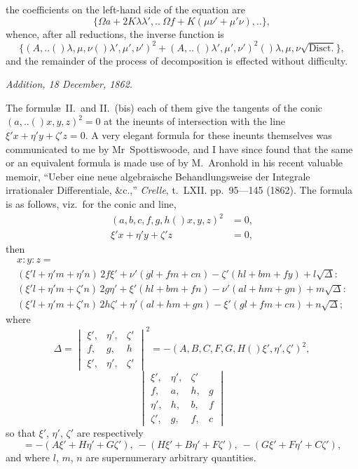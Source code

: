 \documentclass[11pt,a4paper]{book}
\providecommand{\qform}[1]{(#1)}
\begin{document}
the coefficients on the left-hand side of the equation are
\[
\{\Omega a + 2K\lambda\lambda',..\ \Omega f + K(\mu\nu' + \mu'\nu),..\},
\]
whence, after all reductions, the inverse function is
\[
\{(A,..\!\qform{}{\lambda, \mu, \nu}\!\qform{}{\lambda', \mu', \nu'})^{2}
+ (A,..\!\qform{}{\lambda', \mu', \nu'})^{2}\!\qform{}{\lambda, \mu, \nu}
\sqrt{\text{Disct.}}\},
\]
and the remainder of the process of decomposition is effected without difficulty.

\medskip
\begin{center}
\textit{Addition, 18 December, 1862.}
\end{center}

The formul\ae\ II.\ and II.\ (bis) each of them give the tangents of the conic
$(a,..\!\qform{}{x, y, z})^{2} = 0$ at the ineunts of intersection with the line
$\xi'x + \eta'y + \zeta'z = 0$. A very elegant formula for these ineunts themselves
was communicated to me by Mr~Spottiswoode, and I have since found that the same or
an equivalent formula is made use of by M.~Aronhold in his recent valuable memoir,
``Ueber eine neue algebraische Behandlungsweise der Integrale irrationaler
Differentiale, \&c.,'' \textit{Crelle}, t.~LXII. pp.~95---145 (1862). The formula is as
follows, viz.\ for the conic and line,
\begin{align*}
(a, b, c, f, g, h\!\qform{}{x, y, z})^{2} &= 0,\\
\xi'x + \eta'y + \zeta'z &= 0,
\end{align*}
then
\begin{multline*}
x : y : z =\\
(\xi'l + \eta'm + \eta'n)\,2f\xi' + \nu'(gl + fm + cn) - \zeta'(hl + bm + fy) + l\sqrt{\Delta} :\\
(\xi'l + \eta'm + \zeta'n)\,2g\eta' + \xi'(hl + bm + fn) - \nu'(al + hm + gn) + m\sqrt{\Delta} :\\
(\xi'l + \eta'm + \zeta'n)\,2h\zeta' + \eta'(al + hm + gn) - \xi'(gl + fm + cn) + n\sqrt{\Delta};
\end{multline*}
where
\[
\Delta =
\begin{vmatrix}
\xi', & \eta', & \zeta'\\
f, & g, & h\\
\xi', & \eta', & \zeta'
\end{vmatrix}^{2}
= -(A, B, C, F, G, H\!\qform{}{\xi', \eta', \zeta'})^{2},
\]
\[
\begin{vmatrix}
\xi', & \eta', & \zeta'\\
f, & a, & h, & g\\
\eta', & h, & b, & f\\
\zeta', & g, & f, & c
\end{vmatrix}
\]
so that $\xi'$, $\eta'$, $\zeta'$ are respectively
\[
= -(A\xi' + H\eta' + G\zeta'),\ -(H\xi' + B\eta' + F\zeta'),\ -(G\xi' + F\eta' + C\zeta'),
\]
and where $l$, $m$, $n$ are supernumerary arbitrary quantities.
\end{document}
